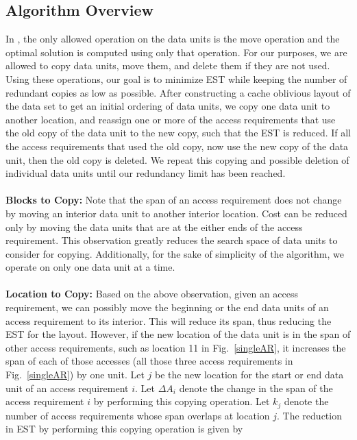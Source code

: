\subsection{Algorithm Overview}

In \cite{cacheobliviouslayout}, the only allowed operation on the data units is
the move operation and the optimal solution is computed using only that
operation. For our purposes, we are allowed to copy data units, move them, and
delete them if they are not used. Using these operations, our goal is to minimize EST
while keeping the number of redundant copies as low as possible. After constructing a cache oblivious layout 
of the data set to get an initial ordering of data units, we copy one data unit
to another location, and reassign one or more of the access requirements that
use the old copy of the data unit to the new copy, such that the EST is
reduced.  If all the access requirements that used the old copy, now use the
new copy of the data unit, then the old copy is deleted.  We repeat this
copying and possible deletion of individual data units until our redundancy
limit has been reached. \\
\\
{\bf Blocks to Copy:} Note that the span of an access requirement does not
change by moving an interior data unit to another interior location. Cost can
be reduced only by moving the data units that are at the either ends of the access
requirement. This observation greatly reduces the search space of data units to
consider for copying. Additionally, for the sake of simplicity of the algorithm, we operate
on only one data unit at a time. \\
\\
{\bf Location to Copy:} Based on the above observation, given an access
requirement, we can possibly move the beginning or the end data units of an
access requirement to its interior. This will reduce its span, thus reducing
the EST for the layout. However, if the new location of the data unit is in the
span of other access requirements, such as location 11 in Fig.~\ref{singleAR},
it increases the span of each of those accesses (all those three access
requirements in Fig.~\ref{singleAR}) by one unit.
Let $j$ be the new location for the start or end data unit of an access
requirement $i$. Let $\Delta A_i$ denote the change in the span of the access
requirement $i$ by performing this copying operation. Let  $k_j$ denote the
number of access requirements whose span overlaps at location $j$.  The
reduction in EST by performing this copying operation is given by 
